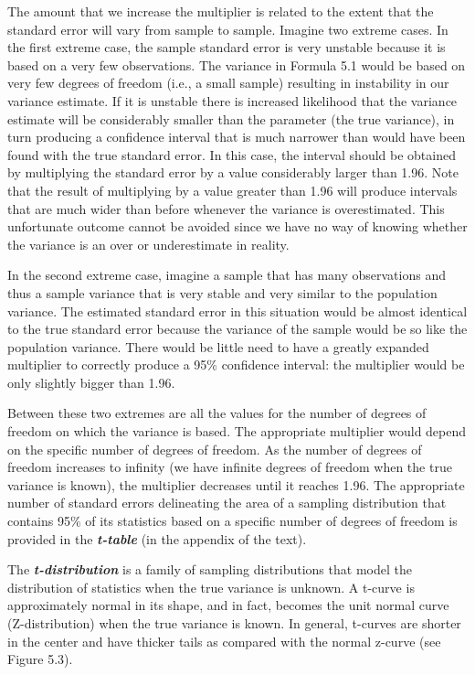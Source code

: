 \documentclass[12pt]{article}
\begin{document}
The amount that we increase the multiplier is related to the extent that the standard error will vary from sample to sample. Imagine two extreme cases. In the first extreme case, the sample standard error is very unstable because it is based on a very few observations. The variance in Formula 5.1 would be based on very few degrees of freedom (i.e., a small sample) resulting in instability in our variance estimate. If it is unstable there is increased likelihood that the variance estimate will be considerably smaller than the parameter (the true variance), in turn producing a confidence interval that is much narrower than would have been found with the true standard error. In this case, the interval should be obtained by multiplying the standard error by a value considerably larger than 1.96. Note that the result of multiplying by a value greater than 1.96 will produce intervals that are much wider than before whenever the variance is overestimated. This unfortunate outcome cannot be avoided since we have no way of knowing whether the variance is an over or underestimate in reality.

In the second extreme case, imagine a sample that has many observations and thus a sample variance that is very stable and very similar to the population variance. The estimated standard error in this situation would be almost identical to the true standard error because the variance of the sample would be so like the population variance. There would be little need to have a greatly expanded multiplier to correctly produce a 95\% confidence interval: the multiplier would be only slightly bigger than 1.96.

Between these two extremes are all the values for the number of degrees of freedom on which the variance is based. The appropriate multiplier would depend on the specific number of degrees of freedom. As the number of degrees of freedom increases to infinity (we have infinite degrees of freedom when the true variance is known), the multiplier decreases until it reaches 1.96. The appropriate number of standard errors delineating the area of a sampling distribution that contains 95\% of its statistics based on a specific number of degrees of freedom is provided in the \textbf{\textit{t-table}} (in the appendix of the text).

The \textbf{\textit{t-distribution}} is a family of sampling distributions that model the distribution of statistics when the true variance is unknown. A t-curve is approximately normal in its shape, and in fact, becomes the unit normal curve (Z-distribution) when the true variance is known. In general, t-curves are shorter in the center and have thicker tails as compared with the normal z-curve (see Figure 5.3).
\end{document}
